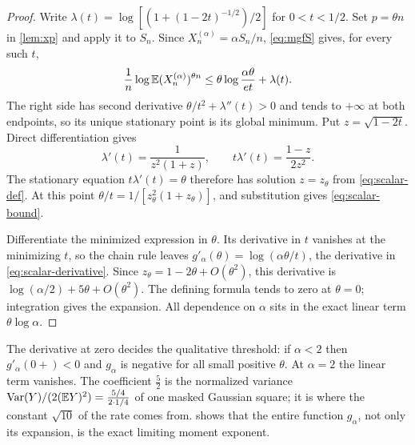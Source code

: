 \begin{proof}
Write $\lambda(t)=\log[(1+(1-2t)^{-1/2})/2]$ for $0<t<1/2$.
Set $p=\theta n$ in \cref{lem:xp} and apply it to $S_n$. Since $X_n^{(\alpha)}=\alpha S_n/n$, \cref{eq:mgfS} gives, for every such $t$,
\[
\frac1n\log\mathbb{E}(X_n^{(\alpha)})^{\theta n}
\le \theta\log\frac{\alpha\theta}{et}+\lambda(t).
\]
The right side has second derivative $\theta/t^2+\lambda''(t)>0$ and tends to $+\infty$ at both endpoints, so its unique stationary point is its global minimum. Put $z=\sqrt{1-2t}$. Direct differentiation gives
\[
\lambda'(t)=\frac1{z^2(1+z)},\qquad
t\lambda'(t)=\frac{1-z}{2z^2}.
\]
The stationary equation $t\lambda'(t)=\theta$ therefore has solution $z=z_\theta$ from \cref{eq:scalar-def}. At this point $\theta/t=1/[z_\theta^2(1+z_\theta)]$, and substitution gives \cref{eq:scalar-bound}.

Differentiate the minimized expression in $\theta$. Its derivative in $t$ vanishes at the minimizing $t$, so the chain rule leaves $g'_\alpha(\theta)=\log(\alpha\theta/t)$, the derivative in \cref{eq:scalar-derivative}. Since $z_\theta=1-2\theta+O(\theta^2)$, this derivative is $\log(\alpha/2)+5\theta+O(\theta^2)$. The defining formula tends to zero at $\theta=0$; integration gives the expansion. All dependence on $\alpha$ sits in the exact linear term $\theta\log\alpha$.
\end{proof}

The derivative at zero decides the qualitative threshold: if $\alpha<2$ then $g'_\alpha(0+)<0$ and $g_\alpha$ is negative for all small positive $\theta$. At $\alpha=2$ the linear term vanishes. The coefficient $\tfrac52$ is the normalized variance $\operatorname{Var}(Y)/(2(\mathbb{E} Y)^2)=\tfrac{5/4}{2\cdot1/4}$ of one masked Gaussian square; it is where the constant $\sqrt{10}$ of the rate comes from.  shows that the entire function $g_\alpha$, not only its expansion, is the exact limiting moment exponent.
